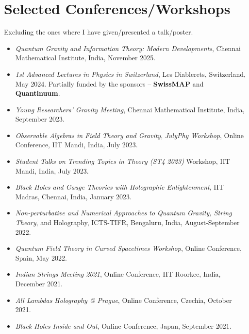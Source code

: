 \documentclass[11pt, letterpaper]{article}
\begin{document}
	\section{Selected Conferences/Workshops}
	Excluding the ones where I have given/presented a talk/poster.
	\begin{itemize}
		\item \textit{Quantum Gravity and Information Theory: Modern Developments}, Chennai Mathematical Institute, India, November 2025.
		
		\item \textit{1st Advanced Lectures in Physics in Switzerland}, Les Diablerets, Switzerland, May 2024. Partially funded by the sponsors -- \textbf{SwissMAP} and \textbf{Quantinuum}.
		
		\item \textit{Young Researchers' Gravity Meeting}, Chennai Mathematical Institute, India, September 2023.
		
		\item \textit{Observable Algebras in Field Theory and Gravity}, \textit{JulyPhy Workshop}, Online Conference, IIT Mandi, India, July 2023.
		
		\item \textit{Student Talks on Trending Topics in Theory (ST4 2023)} Workshop, IIT Mandi, India, July 2023.
		
		\item \textit{Black Holes and Gauge Theories with Holographic Enlightenment}, IIT Madras, Chennai, India, January 2023.
		
		\item \textit{Non-perturbative and Numerical Approaches to Quantum Gravity, String Theory}, and Holography, ICTS-TIFR, Bengaluru, India, August-September 2022.
		
		\item \textit{Quantum Field Theory in Curved Spacetimes Workshop}, Online Conference, Spain, May 2022.
		
		\item \textit{Indian Strings Meeting 2021}, Online Conference, IIT Roorkee, India, December 2021.
		
		\item \textit{All Lambdas Holography @ Prague}, Online Conference, Czechia, October 2021.
		
		\item \textit{Black Holes Inside and Out}, Online Conference, Japan, September 2021.
	\end{itemize}
	
\end{document}
